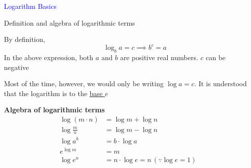 \documentclass[14pt,fleqn]{extarticle}
\begin{document}
\begin{skill}
\begin{narrow}
\textcolor{blue}{Logarithm Basics}

Definition and algebra of logarithmic terms 
\end{narrow}

\reason 

By definition, \[ \qquad \log_b a = c \implies b^c = a \]
In the above expression, both $a$ and $b$ are positive real numbers. $c$ can be negative \newline 

Most of the time, however, we would
only be writing $\log a = c$. It is understood that the logarithm 
is to the \underline{base $e$}\newline 

\textbf{Algebra of logarithmic terms}
\begin{align}
\log (m\cdot n) &= \log m + \log n \\
\log \frac{m}{n} &= \log m - \log n \\ 
\log a^b &= b\cdot \log a \\ 
e^{\log m} &= m \\
\log e^{n} &= n\cdot\log e = n\,(\because \log e = 1)
\end{align}
\end{skill}
\end{document}
